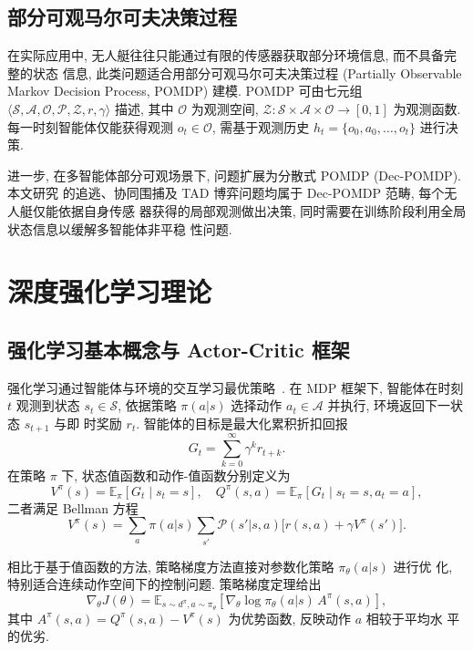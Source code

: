 \subsection{部分可观马尔可夫决策过程}
\label{subsec:pomdp}
在实际应用中, 无人艇往往只能通过有限的传感器获取部分环境信息, 而不具备完整的状态
信息, 此类问题适合用部分可观马尔可夫决策过程 (Partially Observable Markov
Decision Process, POMDP) 建模. POMDP 可由七元组 $\langle\mathcal{S},
\mathcal{A}, \mathcal{O}, \mathcal{P}, \mathcal{Z}, r, \gamma\rangle$ 描述, 其中
$\mathcal{O}$ 为观测空间, $\mathcal{Z}: \mathcal{S}\times\mathcal{A}\times\mathcal{O}\to [0,1]$
为观测函数. 每一时刻智能体仅能获得观测 $o_t\in\mathcal{O}$, 需基于观测历史
$h_t=\{o_0,a_0,\ldots,o_t\}$ 进行决策.

进一步, 在多智能体部分可观场景下, 问题扩展为分散式 POMDP (Dec-POMDP). 本文研究
的追逃、协同围捕及 TAD 博弈问题均属于 Dec-POMDP 范畴, 每个无人艇仅能依据自身传感
器获得的局部观测做出决策, 同时需要在训练阶段利用全局状态信息以缓解多智能体非平稳
性问题.

\section{深度强化学习理论}
\label{sec:drl_theory}

\subsection{强化学习基本概念与 Actor-Critic 框架}
\label{subsec:rl_basic}
强化学习通过智能体与环境的交互学习最优策略~\cite{sutton2018reinforcement}. 在 MDP
框架下, 智能体在时刻 $t$ 观测到状态 $s_t\in\mathcal{S}$, 依据策略
$\pi(a|s)$ 选择动作 $a_t\in\mathcal{A}$ 并执行, 环境返回下一状态 $s_{t+1}$ 与即
时奖励 $r_t$. 智能体的目标是最大化累积折扣回报
\begin{equation}
G_t = \sum_{k=0}^{\infty}\gamma^k r_{t+k}.
\end{equation}
在策略 $\pi$ 下, 状态值函数和动作-值函数分别定义为
\begin{equation}
V^\pi(s) = \mathbb{E}_\pi[G_t\mid s_t=s], \quad
Q^\pi(s,a) = \mathbb{E}_\pi[G_t\mid s_t=s, a_t=a],
\end{equation}
二者满足 Bellman 方程
\begin{equation}
V^\pi(s) = \sum_{a}\pi(a|s)\sum_{s'}\mathcal{P}(s'|s,a)\big[r(s,a) + \gamma V^\pi(s')\big].
\end{equation}

相比于基于值函数的方法, 策略梯度方法直接对参数化策略 $\pi_\theta(a|s)$ 进行优
化, 特别适合连续动作空间下的控制问题. 策略梯度定理给出
\begin{equation}
\nabla_\theta J(\theta) = \mathbb{E}_{s\sim d^\pi, a\sim \pi_\theta}\left[\nabla_\theta \log \pi_\theta(a|s)\, A^\pi(s,a)\right],
\end{equation}
其中 $A^\pi(s,a) = Q^\pi(s,a) - V^\pi(s)$ 为优势函数, 反映动作 $a$ 相较于平均水
平的优劣.

